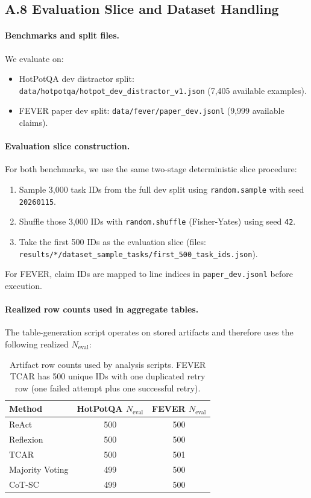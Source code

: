 
\subsection{A.8 Evaluation Slice and Dataset Handling}
\paragraph{Benchmarks and split files.}
We evaluate on:
\begin{itemize}
\item HotPotQA dev distractor split: \texttt{data/hotpotqa/hotpot\_dev\_distractor\_v1.json} (7,405 available examples).
\item FEVER paper dev split: \texttt{data/fever/paper\_dev.jsonl} (9,999 available claims).
\end{itemize}

\paragraph{Evaluation slice construction.}
For both benchmarks, we use the same two-stage deterministic slice procedure:
\begin{enumerate}
\item Sample 3,000 task IDs from the full dev split using \texttt{random.sample} with seed \texttt{20260115}.
\item Shuffle those 3,000 IDs with \texttt{random.shuffle} (Fisher-Yates) using seed \texttt{42}.
\item Take the first 500 IDs as the evaluation slice (files: \texttt{results/*/dataset\_sample\_tasks/first\_500\_task\_ids.json}).
\end{enumerate}
For FEVER, claim IDs are mapped to line indices in \texttt{paper\_dev.jsonl} before execution.

\paragraph{Realized row counts used in aggregate tables.}
The table-generation script operates on stored artifacts and therefore uses the following realized $N_{\text{eval}}$:
\begin{table}[t]
\centering
\small
\begin{tabular}{lcc}
\hline
Method & HotPotQA $N_{\text{eval}}$ & FEVER $N_{\text{eval}}$ \\
\hline
ReAct & 500 & 500 \\
Reflexion & 500 & 500 \\
TCAR & 500 & 501 \\
Majority Voting & 499 & 500 \\
CoT-SC & 499 & 500 \\
\hline
\end{tabular}
\caption{Artifact row counts used by analysis scripts. FEVER TCAR has 500 unique IDs with one duplicated retry row (one failed attempt plus one successful retry).}
\end{table}


